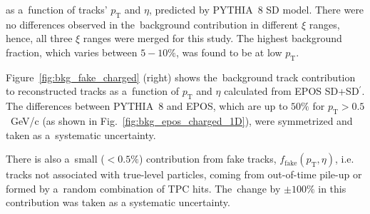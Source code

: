 as a~function of tracks' $p_{\textrm{T}}$ and $\eta$, predicted by PYTHIA~8 SD model. There were no differences observed in the~background contribution in different $\xi$ ranges, hence, all three $\xi$ ranges were merged for this study. The highest background fraction, which varies between $5-10\%$, was found to be at low $p_{\textrm{T}}$.  %


Figure~\ref{fig:bkg_fake_charged} (right) shows the~background track contribution to reconstructed tracks as a~function of $p_\textrm{T}$ and $\eta$ calculated from EPOS SD+SD$^\prime$. The differences between
PYTHIA~8 and EPOS, which are up to $50\%$ for $p_\textrm{T}>0.5$~GeV/c (as shown in Fig.~\ref{fig:bkg_epos_charged_1D}), were symmetrized and taken as a~systematic uncertainty.

There is also a~small ($<0.5\%$) contribution from fake tracks, $f_{\textrm{fake}}\left(p_{\textrm{T}},\eta\right)$, i.e. tracks not associated with true-level particles, coming from out-of-time pile-up or  formed by a~random combination of TPC hits. The~change by $\pm100\%$ in this contribution was taken as a systematic uncertainty.

